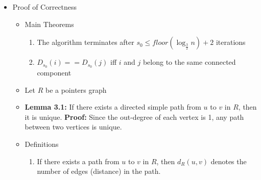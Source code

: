 \documentclass[a4paper]{article}
\begin{document}
\begin{itemize}
\begin{itemize}
\begin{lstlisting}
Step 4:
  if $ i \leq n$
  then $D_s(i) = D_s(D_s(i))$ (second collapsing)
  
Step 5:
  $s = s + 1$
  if $i \leq n$ and $Q(i) == s$ (if vertex is not stagnant)
  then $s' = s' + 1$
         
\end{lstlisting} 

\item Notice that one of the reasons we need a processor for both edge ordered pairs $(i, j)$ and $(j, i)$ is so that both directions of the edges will be checked in steps 2 and 3 above

\item Also notice that for the hooking steps (2 and 3), multiple processors for vertices pointing to the same root will be trying to simultaneously hook the root on different trees. One wins, and we don't care which

\item As soon as all trees are stagnated, the algorithm will terminate

\item Synchronization is required before each line of the program

\end{itemize}

\item Proof of Correctness
\begin{itemize}
\item Main Theorems
\begin{enumerate}
\item The algorithm terminates after $s_0 \leq floor(\log_{\frac{3}{2}} n) + 2$ iterations

\item $D_{s_0}(i) == D_{s_0}(j)$ iff $i$ and $j$ belong to the same connected component
\end{enumerate}

\item Let $R$ be a pointers graph

\item \textbf{Lemma 3.1:} If there exists a directed simple path from $u$ to $v$ in $R$, then it is unique. \textbf{Proof:} Since the out-degree of each vertex is 1, any path between two vertices is unique.

\item Definitions
\begin{enumerate}
\item If there exists a path from $u$ to $v$ in $R$, then $d_R(u, v)$ denotes the number of edges (distance) in the path.


\end{enumerate}
\end{itemize}
\end{itemize}
\end{document}
